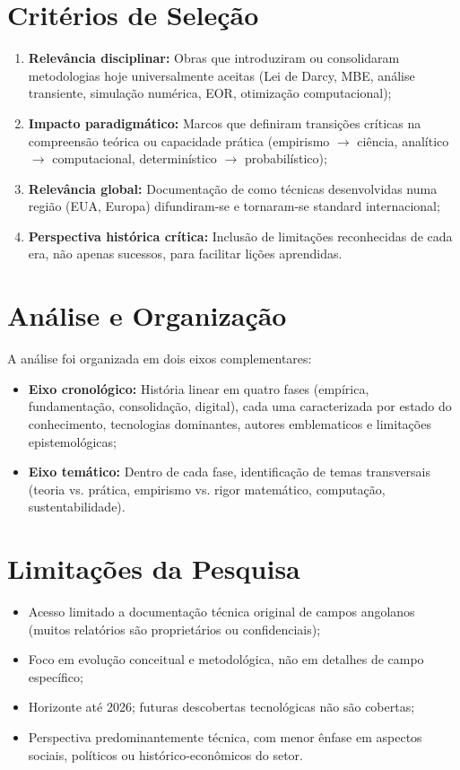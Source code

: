 \documentclass[12pt,a4paper,oneside,brazilian,sumario=tradicional]{abntex2}
\begin{document}
\section{Critérios de Seleção}

\begin{enumerate}
  \item \textbf{Relevância disciplinar:} Obras que introduziram ou consolidaram metodologias hoje universalmente aceitas (Lei de Darcy, MBE, análise transiente, simulação numérica, EOR, otimização computacional);
  \item \textbf{Impacto paradigmático:} Marcos que definiram transições críticas na compreensão teórica ou capacidade prática (empirismo $\rightarrow$ ciência, analítico $\rightarrow$ computacional, determinístico $\rightarrow$ probabilístico);
  \item \textbf{Relevância global:} Documentação de como técnicas desenvolvidas numa região (EUA, Europa) difundiram-se e tornaram-se standard internacional;
  \item \textbf{Perspectiva histórica crítica:} Inclusão de limitações reconhecidas de cada era, não apenas sucessos, para facilitar lições aprendidas.
\end{enumerate}

\section{Análise e Organização}

A análise foi organizada em dois eixos complementares:

\begin{itemize}
  \item \textbf{Eixo cronológico:} História linear em quatro fases (empírica, fundamentação, consolidação, digital), cada uma caracterizada por estado do conhecimento, tecnologias dominantes, autores emblematicos e limitações epistemológicas;
  \item \textbf{Eixo temático:} Dentro de cada fase, identificação de temas transversais (teoria vs. prática, empirismo vs. rigor matemático, computação, sustentabilidade).
\end{itemize}

\section{Limitações da Pesquisa}

\begin{itemize}
  \item Acesso limitado a documentação técnica original de campos angolanos (muitos relatórios são proprietários ou confidenciais);
  \item Foco em evolução conceitual e metodológica, não em detalhes de campo específico;
  \item Horizonte até 2026; futuras descobertas tecnológicas não são cobertas;
  \item Perspectiva predominantemente técnica, com menor ênfase em aspectos sociais, políticos ou histórico-econômicos do setor.
\end{itemize}
\end{document}
